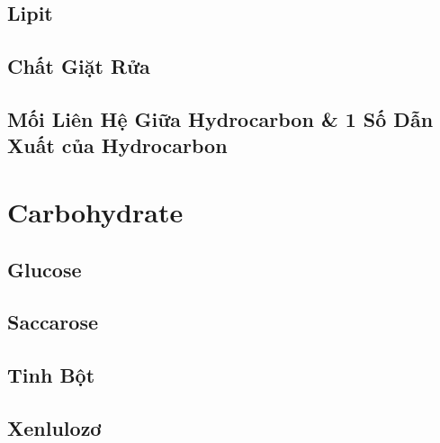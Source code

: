 \documentclass{article}
\numberwithin{equation}{section}
\begin{document}

\subsection{Lipit}


\subsection{Chất Giặt Rửa}


\subsection{Mối Liên Hệ Giữa Hydrocarbon \& 1 Số Dẫn Xuất của Hydrocarbon}


\section{Carbohydrate}

\subsection{Glucose}


\subsection{Saccarose}


\subsection{Tinh Bột}


\subsection{Xenlulozơ}
\end{document}

